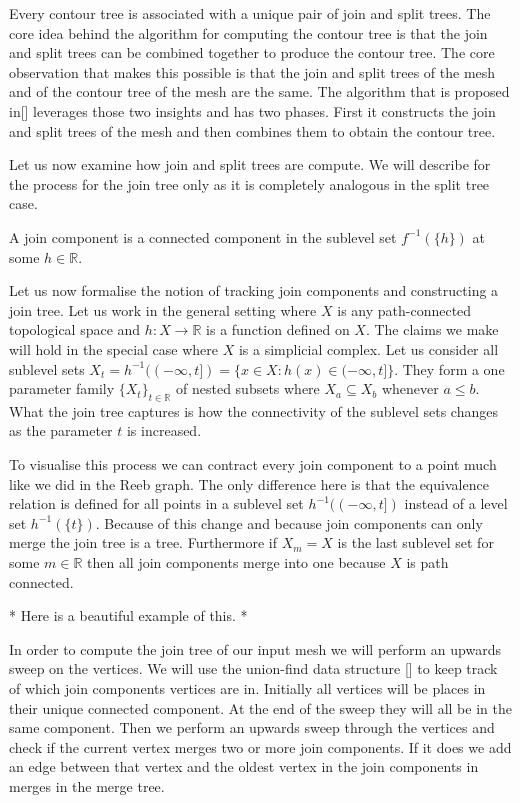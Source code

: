 Every contour tree is associated with a unique pair of join and split trees. The core idea behind the algorithm for computing the contour tree is that the join and split trees can be combined together to produce the contour tree. The core observation that makes this possible is that the join and split trees of the mesh and of the contour tree of the mesh are the same. The algorithm that is proposed in[] leverages those two insights and has two phases. First it constructs the join and split trees of the mesh and then combines them to obtain the contour tree.

Let us now examine how join and split trees are compute. We will describe for the process for the join tree only as it is completely analogous in the split tree case. 

\begin{defn} A join component is a connected component in the sublevel set $f^{-1}(\{h\})$ at some $h \in \mathbb{R}$.  \end{defn}

Let us now formalise the notion of tracking join components and constructing a join tree. Let us work in the general setting where $X$ is any path-connected topological space and $h : X \to \mathbb{R}$ is a function defined on $X$. The claims we make will hold in the special case where $X$ is a simplicial complex. Let us consider all sublevel sets $X_t = h^{-1}((-\infty, t]) = \{x \in X : h(x) \in (-\infty, t] \}$. They form a one parameter family $\{X_t\}_{t \in \mathbb{R}}$ of nested subsets where $X_a \subseteq X_b$ whenever $a \le b$. What the join tree captures is how the connectivity of the sublevel sets changes as the parameter $t$ is increased. 
    
To visualise this process we can contract every join component to a point much like we did in the Reeb graph. The only difference here is that the equivalence relation is defined for all points in a sublevel set $h^{-1}((-\infty, t])$ instead of a level set $h^{-1}(\{t\})$. Because of this change and because join components can only merge the join tree is a tree. Furthermore if $X_m = X$ is the last sublevel set for some $m \in \mathbb{R}$ then all join components merge into one because $X$ is path connected.

* Here is a beautiful example of this. *

In order to compute the join tree of our input mesh we will perform an upwards sweep on the vertices. We will use the union-find data structure [] to keep track of which join components vertices are in. Initially all vertices will be places in their unique connected component. At the end of the sweep they will all be in the same component. Then we perform an upwards sweep through the vertices and check if the current vertex merges two or more join components. If it does we add an edge between that vertex and the oldest vertex in the join components in merges in the merge tree.



